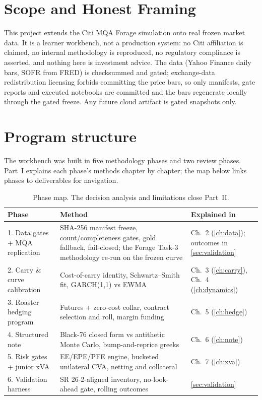 \documentclass[11pt,a4paper]{article}
\begin{document}
\section{Scope and Honest Framing}\label{sec:scope}

This project extends the Citi MQA Forage simulation onto real frozen
market data. It is a learner workbench, not a production system: no Citi
affiliation is claimed, no internal methodology is reproduced, no
regulatory compliance is asserted, and nothing here is investment advice.
The data (Yahoo Finance daily bars, SOFR from FRED) is checksummed
and gated; exchange-data redistribution licensing forbids committing the
price bars, so only manifests, gate reports and executed notebooks are
committed and the bars regenerate locally through the gated freeze. Any
future cloud artifact is gated snapshots only.

\section{Program structure}

The workbench was built in five methodology phases and two review
phases. Part~I explains each phase's methods chapter by chapter; the
map below links phases to deliverables for navigation.

\begin{table}[h!]
\centering\small
\begin{tabular}{p{2.2cm}p{7.2cm}p{5.2cm}}
\toprule
\textbf{Phase} & \textbf{Method} & \textbf{Explained in} \\
\midrule
1. Data gates + MQA replication & SHA-256 manifest freeze, count/completeness gates, gold fallback, fail-closed; the Forage Task-3 methodology re-run on the frozen curve & Ch.~2 (\ref{ch:data}); outcomes in \ref{sec:validation} \\
2. Carry \& curve calibration & Cost-of-carry identity, Schwartz--Smith fit, GARCH(1,1) vs EWMA & Ch.~3 (\ref{ch:carry}), Ch.~4 (\ref{ch:dynamics}) \\
3. Roaster hedging program & Futures + zero-cost collar, contract selection and roll, margin funding & Ch.~5 (\ref{ch:hedge}) \\
4. Structured note & Black-76 closed form vs antithetic Monte Carlo, bump-and-reprice greeks & Ch.~6 (\ref{ch:note}) \\
5. Risk gates + junior xVA & EE/EPE/PFE engine, bucketed unilateral CVA, netting and collateral & Ch.~7 (\ref{ch:xva}) \\
6. Validation harness & SR 26-2-aligned inventory, no-look-ahead gate, rolling outcomes & \ref{sec:validation} \\
\bottomrule
\end{tabular}
\caption{Phase map. The decision analysis and limitations close Part~II.}
\end{table}
\end{document}
